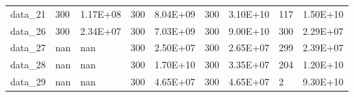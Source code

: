 \begin{table}[!h]
\begin{tabular}{lllllllll}
data\_21 & 300                 & 1.17E+08                & 300                   & 8.04E+09                 & 300                & 3.10E+10               & 117                  & 1.50E+10                \\
data\_26 & 300                 & 2.34E+07                & 300                   & 7.03E+09                 & 300                & 9.00E+10               & 300                  & 2.29E+07                \\
data\_27 & nan                 & nan                     & 300                   & 2.50E+07                 & 300                & 2.65E+07               & 299                  & 2.39E+07                \\
data\_28 & nan                 & nan                     & 300                   & 1.70E+10                 & 300                & 3.35E+07               & 204                  & 1.20E+10                \\
data\_29 & nan                 & nan                     & 300                   & 4.65E+07                 & 300                & 4.65E+07               & 2                    & 9.30E+10                \\ \hline
\end{tabular}
\end{table}

